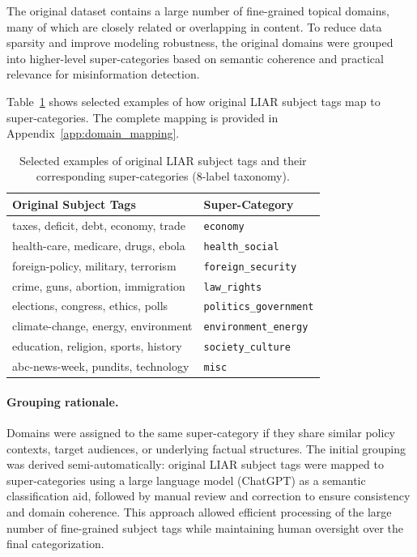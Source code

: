 The original dataset contains a large number of fine-grained topical domains, many of which are closely related or overlapping in content. To reduce data sparsity and improve modeling robustness, the original domains were grouped into higher-level super-categories based on semantic coherence and practical relevance for misinformation detection.

Table~\ref{tab:domain_mapping} shows selected examples of how original LIAR subject tags map to super-categories. The complete mapping is provided in Appendix~\ref{app:domain_mapping}.

\begin{table}[h]
\centering
\caption{Selected examples of original LIAR subject tags and their 
corresponding super-categories (8-label taxonomy).}
\label{tab:domain_mapping}
\small
\begin{tabular}{ll}
\toprule
Original Subject Tags & Super-Category \\
\midrule
taxes, deficit, debt, economy, trade & \texttt{economy} \\
health-care, medicare, drugs, ebola & \texttt{health\_social} \\
foreign-policy, military, terrorism & \texttt{foreign\_security} \\
crime, guns, abortion, immigration & \texttt{law\_rights} \\
elections, congress, ethics, polls & \texttt{politics\_government} \\
climate-change, energy, environment & \texttt{environment\_energy} \\
education, religion, sports, history & \texttt{society\_culture} \\
abc-news-week, pundits, technology & \texttt{misc} \\
\bottomrule
\end{tabular}
\end{table}

\paragraph{Grouping rationale.}
Domains were assigned to the same super-category if they share similar policy contexts, target audiences, or underlying factual 
structures. The initial grouping was derived semi-automatically: original LIAR subject tags were mapped to super-categories using 
a large language model (ChatGPT) as a semantic classification aid, followed by manual review and correction to ensure consistency and domain coherence. This approach allowed efficient processing of the large number of fine-grained subject tags while maintaining human oversight over the final categorization.

